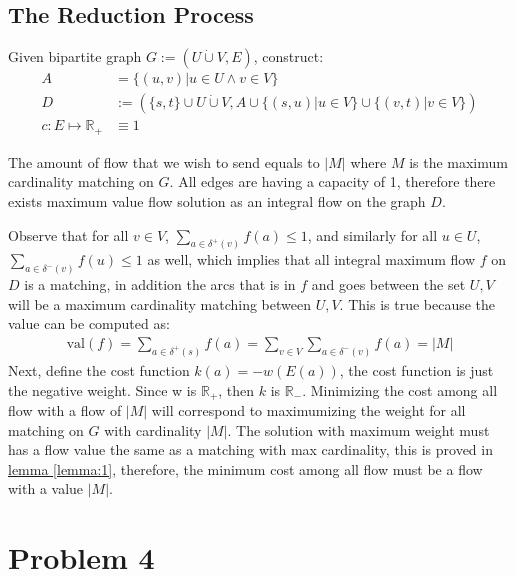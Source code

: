 \documentclass[]{article}
\theoremstyle{definition}
\begin{document}
    \subsection{The Reduction Process}
        Given bipartite graph $G:= (U\dot\cup V, E)$, construct: 
        \begin{align}
            A &= \{(u, v)| u\in U\wedge v \in V\}
            \\
            D &:= (\{s, t\}\cup U\dot\cup V, A \cup \{(s, u)| u \in V\}\cup \{(v, t)| v \in V\})   
            \\
            c: E\mapsto \mathbb R_+ &\equiv 1
        \end{align}
        \par
        The amount of flow that we wish to send equals to $|M|$ where $M$ is the maximum cardinality matching on $G$. All edges are having a capacity of 1, therefore there exists maximum value flow solution as an integral flow on the graph $D$.
        \par
        Observe that for all $v \in V$, $\sum_{a \in \delta^+(v)}^{}f(a) \le 1$, and similarly for all $u \in U$, $\sum_{a \in \delta^-(v)}^{}f(u) \le 1$ as well, which implies that all integral maximum flow $f$ on $D$ is a matching, in addition the arcs that is in $f$ and goes between the set $U, V$ will be a maximum cardinality matching between $U, V$. This is true because the value can be computed as: 
        \begin{align}
            \text{val}(f) = \sum_{a\in \delta^+(s)}f(a) = 
            \sum_{v\in V}^{}\sum_{a \in \delta^-{(v)}}f(a) = |M|
        \end{align}
        Next, define the cost function $k(a) = -w(E(a))$, the cost function is just the negative weight. Since w is $\mathbb R_+$, then $k$ is $\mathbb R_-$. Minimizing the cost among all flow with a flow of $|M|$ will correspond to maximumizing the weight for all matching on $G$ with cardinality $|M|$. The solution with maximum weight must has a flow value the same as a matching with max cardinality, this is proved in \hyperref[lemma:1]{lemma \ref*{lemma:1}}, therefore, the minimum cost among all flow must be a flow with a value $|M|$. 

\section{Problem 4}
    
        
        
\end{document}
